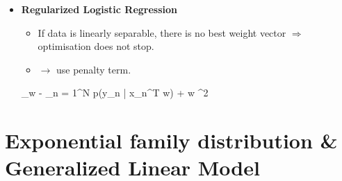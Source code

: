 \begin{itemize}
	\item \textbf{Regularized Logistic Regression}
		\begin{itemize}
	    	\item If data is linearly separable, there is no best weight vector $\Rightarrow$ optimisation does not stop.
	    	\item $\rightarrow$ use penalty term.
	    \end{itemize}
	\begin{myalign*}
	    \argmin_{\*w} 
	    	- \sum_{n = 1}^N \ln p(\*y_n | \*x_n^T \* w) +  \lVert \*w \lVert^2
	    \end{myalign*}
\end{itemize}

\section{Exponential family distribution \& Generalized Linear Model}


